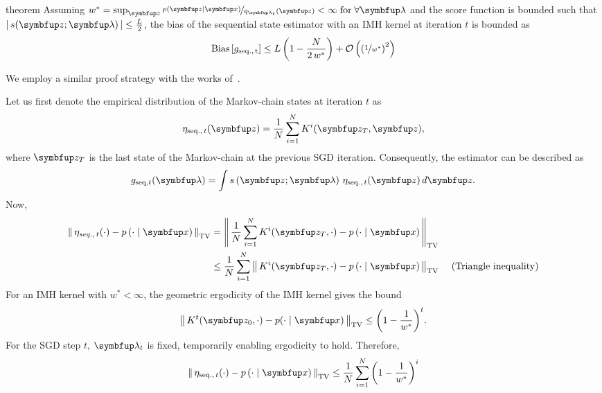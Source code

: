 
\begin{theoremEnd}{theorem}\label{thm:bias_seq}
  Assuming \(w^* = \sup_{\vz} \nicefrac{p\left(\vz\mid\vx\right)}{q_{\vlambda_{t}}\left(\vz\right)} < \infty\; \text{for} \; \forall \vlambda \) and the score function is bounded such that \(\left|\,s(\vz; \vlambda)\,\right| \leq \frac{L}{2}\), the bias of the sequential state estimator with an IMH kernel at iteration \(t\) is bounded as
  {\small
  \[
  \mathrm{Bias}\left[ g_{\mathrm{seq.,\, t}} \right] \leq L \left( 1 - \frac{N}{2 \, w^*} \right) + \mathcal{O}\left({\left(\nicefrac{1}{w^*}\right)}^2\right)
  \]
  }
\end{theoremEnd}
%
\begin{proofEnd}
  We employ a similar proof strategy with the works of~\citet[Theorem 4]{jiang_mcmc_2021}.

  Let us first denote the empirical distribution of the Markov-chain states at iteration \(t\) as
  \begin{align}
    \eta_{\mathrm{seq.},\, t}(\vz) = \frac{1}{N} \sum_{i=1}^N K^{i}(\vz_T, \vz),
  \end{align}
  where \(\vz_{T}\) is the last state of the Markov-chain at the previous SGD iteration.
  Consequently, the estimator can be described as
  \begin{align}
      g_{\mathrm{seq}, t}(\vlambda) = \int s\left(\vz; \vlambda\right) \, \eta_{\mathrm{seq.},\, t}(\vz) \, d\vz.
  \end{align}
  Now,
  \begin{align}
    \DTV{ \eta_{seq.,\, t}(\cdot) }{p\left(\cdot\mid\vx\right)}
    &= \DTV{\frac{1}{N} \sum_{i=1}^N K^{i}(\vz_T, \cdot)}{p\left(\cdot\mid\vx\right)} \\
    &\leq \frac{1}{N} \sum_{i=1}^N  \DTV{K^{i}(\vz_T, \cdot)}{p\left(\cdot\mid\vx\right)} &\text{ (Triangle inequality)}
  \end{align}
 For an IMH kernel with \(w^* < \infty\), the geometric ergodicity of the IMH kernel \citep[Theorem 2.1]{10.2307/2242610} gives the bound
 \begin{align}
   \DTV{K^t(\vz_{0}, \cdot)}{p(\cdot\mid\vx)} \leq {\left(1 - \frac{1}{w^*}\right)}^t.
 \end{align}
 For the SGD step \(t\), \(\vlambda_{t}\) is fixed, temporarily enabling ergodicity to hold.
 Therefore, 
  \begin{align}
    \DTV{ \eta_{\mathrm{seq.},\, t}(\cdot) }{p\left(\cdot\mid\vx\right)}
    &\leq \frac{1}{N} \sum_{i=1}^N {\left( 1 - \frac{1}{w^*} \right)}^i \\

\end{align}
\end{proofEnd}
